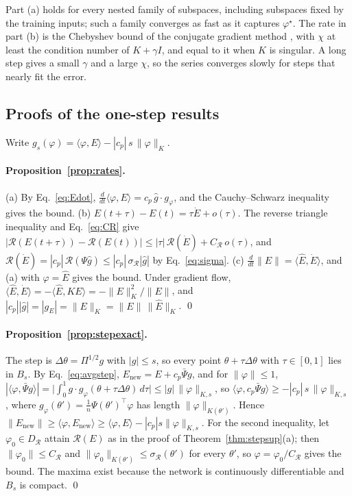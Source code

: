 \documentclass[11pt]{article}
\theoremstyle{definition}
\theoremstyle{remark}
\newcommand{\Rgh}{\mathcal{R}}           %
\newcommand{\sR}{\sigma_{\Rgh}}
\newcommand{\CR}{C_{\Rgh}}
\newcommand{\ip}[2]{\langle #1,#2\rangle}
\begin{document}
Part (a) holds for every nested family of subspaces, including subspaces fixed by the training inputs; such a family converges as fast as it captures $\varphi^\star$.
The rate in part (b) is the Chebyshev bound of the conjugate gradient method \cite{saad2003}, with $\chi$ at least the condition number of $K + \gamma I$, and equal to it when $K$ is singular.
A long step gives a small $\gamma$ and a large $\chi$, so the series converges slowly for steps that nearly fit the error.

\subsection{Proofs of the one-step results}\label{app:step}

Write $g_s(\varphi) = \ip{\varphi}{E} - |c_p|\,s\,\|\varphi\|_K$.

\paragraph{Proposition~\ref{prop:rates}.}
(a) By Eq.~\eqref{eq:Edot}, $\tfrac{d}{dt}\ip{\varphi}{E} = c_p\,\hat g\cdot g_\varphi$, and the Cauchy--Schwarz inequality gives the bound.
(b) $E(t+\tau) - E(t) = \tau\dot E + o(\tau)$.
The reverse triangle inequality and Eq.~\eqref{eq:CR} give $|\Rgh(E(t+\tau)) - \Rgh(E(t))| \le |\tau|\,\Rgh(\dot E) + \CR\,o(\tau)$, and $\Rgh(\dot E) = |c_p|\,\Rgh(\Psi\hat g) \le |c_p|\,\sR|\hat g|$ by Eq.~\eqref{eq:sigma}.
(c) $\tfrac{d}{dt}\|E\| = \ip{\hat E}{\dot E}$, and (a) with $\varphi = \hat E$ gives the bound.
Under gradient flow, $\ip{\hat E}{\dot E} = -\ip{\hat E}{KE} = -\|E\|_K^2/\|E\|$, and $|c_p||\hat g| = |g_E| = \|E\|_K = \|E\|\,\|\hat E\|_K$. \qed

\paragraph{Proposition~\ref{prop:stepexact}.}
The step is $\Delta\theta = \Pi^{1/2}g$ with $|g| \le s$, so every point $\theta + \tau\Delta\theta$ with $\tau\in[0,1]$ lies in $B_s$.
By Eq.~\eqref{eq:avgstep}, $E_{\mathrm{new}} = E + c_p\bar\Psi g$, and for $\|\varphi\|\le1$,
$|\ip{\varphi}{\bar\Psi g}| = \big|\int_0^1 g\cdot g_\varphi(\theta+\tau\Delta\theta)\,d\tau\big| \le |g|\,\|\varphi\|_{K,s}$, so $\ip{\varphi}{c_p\bar\Psi g}\ge-|c_p|\,s\,\|\varphi\|_{K,s}$, where $g_\varphi(\theta') = \tfrac1n\Psi(\theta')^\top\varphi$ has length $\|\varphi\|_{K(\theta')}$.
Hence $\|E_{\mathrm{new}}\| \ge \ip{\varphi}{E_{\mathrm{new}}} \ge \ip{\varphi}{E} - |c_p|s\|\varphi\|_{K,s}$.
For the second inequality, let $\varphi_0\in D_\Rgh$ attain $\Rgh(E)$ as in the proof of Theorem~\ref{thm:stepsup}(a); then $\|\varphi_0\| \le \CR$ and $\|\varphi_0\|_{K(\theta')} \le \sR(\theta')$ for every $\theta'$, so $\varphi = \varphi_0/\CR$ gives the bound.
The maxima exist because the network is continuously differentiable and $B_s$ is compact. \qed
\end{document}

